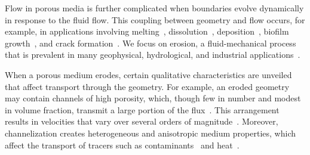 \documentclass{jfm}
\begin{document}
Flow in porous media is further complicated when boundaries evolve 
dynamically in response to the fluid flow. This coupling between
geometry and flow occurs, for example, in applications involving
melting~\citep{bec-vis1998, rycroft2016asymmetric, jambon2018singular,
favier2019rayleigh, morrow2019moving},
dissolution~\citep{kan-zha-che-he2002, mac2015shape, moo2017,
wykes2018self}, deposition~\citep{joh-eli1995, hewett2018modelling},
biofilm growth~\citep{tan-val-wer2015}, and crack
formation~\citep{cho2019crack}. We focus on erosion, a fluid-mechanical
process that is prevalent in many geophysical, hydrological, and
industrial applications~\citep{ris-moo-chi-she-zha2012,
berhanu2012shape, hewett2017evolution, lachaussee2018competitive,
lopez2018cfd, allen2019sde, amin2019role}.

When a porous medium erodes, certain qualitative characteristics are
unveiled that affect transport through the geometry.  For example, an
eroded geometry may contain channels of high porosity, which, though few
in number and modest in volume fraction, transmit a large portion of the
flux~\citep{qua-moo2018}. This arrangement results in velocities that
vary over several orders of magnitude~\citep{all-hea-lab-rei2002}.
Moreover, channelization creates heterogeneous and anisotropic medium
properties, which affect the transport of tracers such as
contaminants~\citep{cve-che-wen1996, dag1987, kon-bre1978} and
heat~\citep{nil-sto1990, ree-sto1995}.
\end{document}
